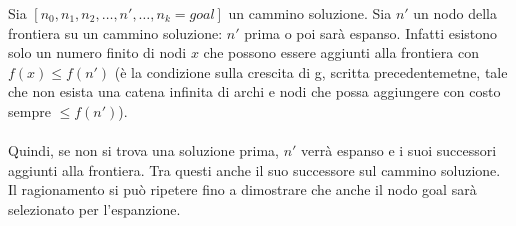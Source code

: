 \begin{demostration}
    Sia $[n_0, n_1, n_2, \dots, n', \dots, n_k = goal]$ un cammino soluzione. Sia $n'$ un nodo della frontiera su un cammino soluzione:
    $n'$ prima o poi sarà espanso. Infatti esistono solo un numero finito di nodi $x$ che possono essere aggiunti alla frontiera con $f(x) \leq f(n')$
    (è la condizione sulla crescita di g, scritta precedentemetne, tale che non esista una catena infinita di archi e nodi che possa aggiungere con costo sempre $\leq f(n')$).\\\\
    Quindi, se non si trova una soluzione prima, $n'$ verrà espanso e i suoi successori aggiunti alla frontiera. Tra questi anche il suo successore sul cammino soluzione.\\
    Il ragionamento si può ripetere fino a dimostrare che anche il nodo goal sarà selezionato per l'espanzione.
\end{demostration}

